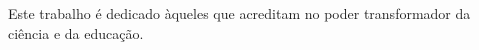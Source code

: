 
\begin{dedicatoria}
\vspace*{\fill}
\begin{center}
Este trabalho é dedicado àqueles que acreditam no poder transformador da ciência e da educação.
\end{center}
\vspace*{\fill}
\end{dedicatoria}
